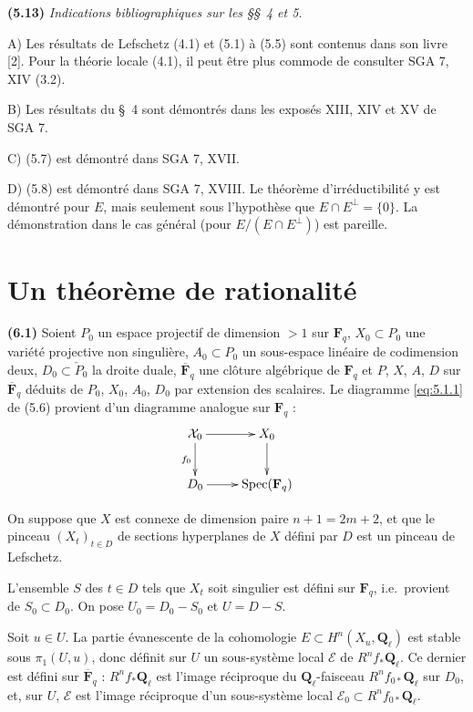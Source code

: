 \documentclass[12pt,a4paper]{amsart}
\theoremstyle{plain}
\theoremstyle{definition}
\theoremstyle{remark}
\DeclareMathOperator{\Spec}{Spec}
\newcommand{\Q}{\mathbf{Q}}
\newcommand{\F}{\mathbf{F}}
\numberwithin{equation}{section}
\begin{document}
\noindent \textbf{(5.13)} \textit{Indications bibliographiques sur les \S\S\ 4 et 5.}

\noindent A) Les r\'esultats de Lefschetz (4.1) et (5.1) \`a (5.5) sont contenus dans son livre [2]. Pour la th\'eorie locale (4.1), il peut \^etre plus commode de consulter SGA 7, XIV (3.2).

\noindent B) Les r\'esultats du \S\ 4 sont d\'emontr\'es dans les expos\'es XIII, XIV et XV de SGA 7.

\noindent C) (5.7) est d\'emontr\'e dans SGA 7, XVII.

\noindent D) (5.8) est d\'emontr\'e dans SGA 7, XVIII. Le th\'eor\`eme d'irr\'eductibilit\'e y est d\'emontr\'e pour $E$, mais seulement sous l'hypoth\`ese que $E\cap E^\perp=\{0\}$. La d\'emonstration dans le cas g\'en\'eral (pour $E/(E\cap E^\perp)$) est pareille.


\section{Un th\'eor\`eme de rationalit\'e}

\noindent \textbf{(6.1)} Soient $P_0$ un espace projectif de dimension $>1$ sur $\F_q$, $X_0\subset P_0$ une vari\'et\'e projective non singuli\`ere, $A_0\subset P_0$ un sous-espace lin\'eaire de codimension deux, $D_0\subset\check{P}_0$ la droite duale, $\overline{\F}_q$ une cl\^oture alg\'ebrique de $\F_q$ et $P$, $X$, $A$, $D$ sur $\overline{\F}_q$ d\'eduits de $P_0$, $X_0$, $A_0$, $D_0$ par extension des scalaires. Le diagramme \eqref{eq:5.1.1} de (5.6) provient d'un diagramme analogue sur $\F_q$ :
\begin{equation}\label{eq:6.1.1}
\xymatrix{
\mathcal{X}_0 \ar[r] \ar[d]_{f_0} & X_0 \ar[d] \\
D_0 \ar[r] & \Spec(\F_q)
}
\end{equation}

On suppose que $X$ est connexe de dimension paire $n+1=2m+2$, et que le pinceau $(X_t)_{t\in D}$ de sections hyperplanes de $X$ d\'efini par $D$ est un pinceau de Lefschetz.

L'ensemble $S$ des $t\in D$ tels que $X_t$ soit singulier est d\'efini sur $\F_q$, i.e.\ provient de $S_0\subset D_0$. On pose $U_0=D_0-S_0$ et $U=D-S$.

Soit $u\in U$. La partie \'evanescente de la cohomologie $E\subset H^n(X_u,\Q_\ell)$ est stable sous $\pi_1(U,u)$, donc d\'efinit sur $U$ un sous-syst\`eme local $\mathscr{E}$ de $R^n f_\ast\Q_\ell$. Ce dernier est d\'efini sur $\overline{\F}_q$ : $R^n f_\ast\Q_\ell$ est l'image r\'eciproque du $\Q_\ell$-faisceau $R^n f_{0\ast}\Q_\ell$ sur $D_0$, et, sur $U$, $\mathscr{E}$ est l'image r\'eciproque d'un sous-syst\`eme local $\mathscr{E}_0\subset R^n f_{0\ast}\Q_\ell$.
\end{document}
